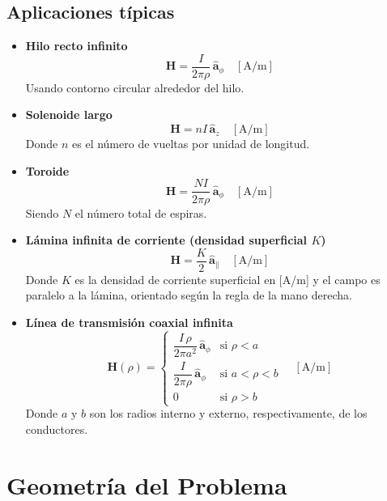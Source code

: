 \documentclass[11pt]{article}
\begin{document}
\subsection*{Aplicaciones típicas}
\begin{itemize}
  \item \textbf{Hilo recto infinito}  
        \[
        \mathbf{H} = \frac{I}{2\pi {\rho}}\,\hat{\boldsymbol{a}}_{\phi} \quad [\text{A/m}]
        \]
        Usando contorno circular alrededor del hilo.

  \item \textbf{Solenoide largo}  
        \[
        \mathbf{H} = nI\,\hat{\boldsymbol{a}}_{z} \quad [\text{A/m}]
        \]
        Donde \(n\) es el número de vueltas por unidad de longitud.

  \item \textbf{Toroide}  
        \[
        \mathbf{H} = \frac{NI}{2\pi {\rho}}\,\hat{\boldsymbol{a}}_{\phi} \quad [\text{A/m}]
        \]
        Siendo \(N\) el número total de espiras.

  \item \textbf{Lámina infinita de corriente (densidad superficial \(K\))}  
        \[
        \mathbf{H} = \frac{K}{2}\,\hat{\boldsymbol{a}}_{\parallel} \quad [\text{A/m}]
        \]
        Donde \(K\) es la densidad de corriente superficial en [A/m] y el campo es paralelo a la lámina, orientado según la regla de la mano derecha.

  \item \textbf{Línea de transmisión coaxial infinita}  
        \[
        \mathbf{H}({\rho}) = 
        \begin{cases}
        \dfrac{I\,{\rho}}{2\pi a^{2}}\,\hat{\boldsymbol{a}}_{\phi} & \text{si } {\rho} < a \\
        \dfrac{I}{2\pi {\rho}}\,\hat{\boldsymbol{a}}_{\phi} & \text{si } a < {\rho} < b \\
        0 & \text{si } {\rho} > b
        \end{cases}
        \quad [\text{A/m}]
        \]
        Donde \(a\) y \(b\) son los radios interno y externo, respectivamente, de los conductores.
\end{itemize}

\newpage

\section*{Geometría del Problema}
\end{document}
